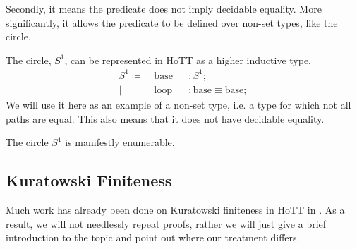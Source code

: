 Secondly, it means the predicate does not imply decidable equality.
More significantly, it allows the predicate to be defined over non-set types,
like the circle.
\begin{romdefinition}[\(S^1\)] \label{circle-def}
  The circle, \(S^1\), can be represented in HoTT as a higher inductive type.
  \begin{equation}
    \begin{alignat}{5}
      S^1 \coloneqq & \; \text{base} &&: S^1 ; \\
      | & \; \text{loop} &&: \text{base} \equiv \text{base} ; 
    \end{alignat}
  \end{equation}
  We will use it here as an example of a non-set type, i.e. a type for which not
  all paths are equal.
  This also means that it does not have decidable equality.
\end{romdefinition}
\begin{romlemma}
  The circle \(S^1\) is manifestly enumerable.
\end{romlemma}
\subsection{Kuratowski Finiteness}
Much work has already been done on Kuratowski finiteness in HoTT in
\cite{fruminFiniteSetsHomotopy2018}.
As a result, we will not needlessly repeat proofs, rather we will just give a
brief introduction to the topic and point out where our treatment differs.

